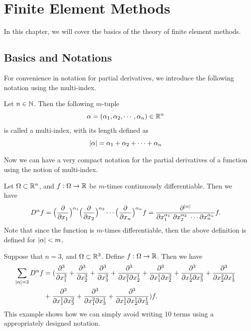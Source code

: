 \chapter{Finite Element Methods}

In this chapter, we will cover the basics of the theory of finite element methods. 

\section{Basics and Notations}
For convenience in notation for partial derivatives, we introduce the following notation using the multi-index.

\begin{definition}
	Let $ n \in \mathbb{N} $. Then the following $m$-tuple
	\[ \alpha = (\alpha_1,\alpha_2,\cdots,\alpha_n) \in \mathbb{R}^n \]
	is called a multi-index, with its length defined as
	\[ |\alpha| = \alpha_1 + \alpha_2 + \cdots + \alpha_n \]
\end{definition}

Now we can have a very compact notation for the partial derivatives of a function using the notion of multi-index.

\begin{definition}
	Let $ \Omega \subset \mathbb{R}^n $, and $ f:\Omega \to \mathbb{R} $ be $ m $-times continuously differentiable. Then we have
	\[ D^\alpha f = \big( \frac{\partial}{\partial x_1} \big)^{\alpha_1} \big( \frac{\partial}{\partial x_2} \big)^{\alpha_2}  \cdots \big( \frac{\partial}{\partial x_n} \big)^{\alpha_n}f = \frac{\partial^{|\alpha|}}{\partial x_1^{\alpha_1}\ \partial x_2^{\alpha_2}\ \cdots \partial x_n^{\alpha_n}} f. \]
	Note that since the function is $ m $-times differentiable, then the above definition is defined for $ |\alpha| < m $.
\end{definition}

\begin{example}
	Suppose that $ n=3 $, and $ \Omega \subset \mathbb{R}^3 $. Define $ f: \Omega \to \mathbb{R} $. Then we have
	\begin{align*}
		\sum_{|\alpha|=3} D^{\alpha} f &=  (\frac{\partial^3}{\partial x_1^{3}} + \frac{\partial^3}{\partial x_2^{3}} + \frac{\partial^3}{\partial x_3^{3}} + \frac{\partial^3}{\partial x_1^{2}\partial x_2^{1}} + \frac{\partial^3}{\partial x_1^{1}\partial x_2^{2}} + \frac{\partial^3}{\partial x_2^{1}\partial x_3^{2}} + \frac{\partial^3}{\partial x_2^{2}\partial x_3^{1}} \\
		&+ \frac{\partial^3}{\partial x_1^{1}\partial x_3^{2}} + \frac{\partial^3}{\partial x_1^{2}\partial x_3^{1}} + \frac{\partial^3}{\partial x_1^{1}\partial x_2^{1}\partial x_3^{1}})f.
	\end{align*}
	This example shows how we can simply avoid writing 10 terms using a appropriately designed notation.
\end{example}

